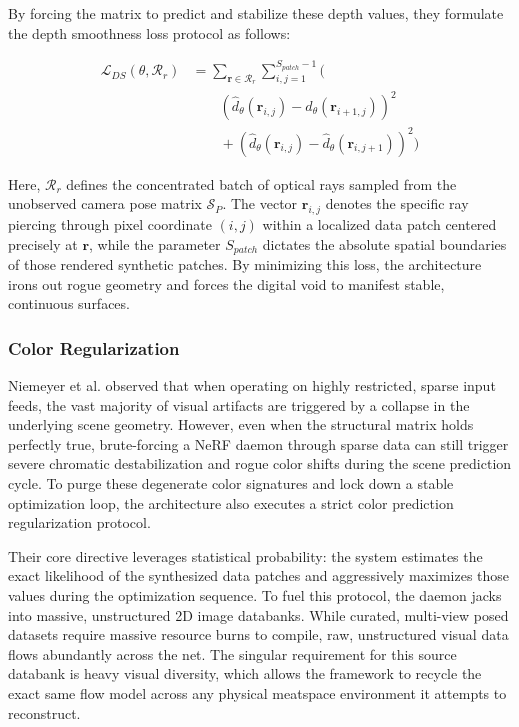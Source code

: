 By forcing the matrix to predict and stabilize these depth values, they formulate the depth smoothness loss protocol as follows:

\begin{equation}
\begin{split}
\mathcal{L}_{DS}(\theta, \mathcal{R}_r) &= \sum_{\mathbf{r} \in \mathcal{R}_r} \sum_{i,j=1}^{S_{patch}-1} \Bigg( \\
&\qquad \left(\hat{d}_\theta(\mathbf{r}_{i,j}) - \hat{d}_\theta(\mathbf{r}_{i+1,j})\right)^2 \\
&\qquad + \left(\hat{d}_\theta(\mathbf{r}_{i,j}) - \hat{d}_\theta(\mathbf{r}_{i,j+1})\right)^2 \Bigg)
\end{split}
\end{equation}

Here, $\mathcal{R}_r$ defines the concentrated batch of optical rays sampled from the unobserved camera pose matrix $\mathcal{S}_P$. The vector $\mathbf{r}_{i,j}$ denotes the specific ray piercing through pixel coordinate $(i,j)$ within a localized data patch centered precisely at $\mathbf{r}$, while the parameter $S_{patch}$ dictates the absolute spatial boundaries of those rendered synthetic patches. By minimizing this loss, the architecture irons out rogue geometry and forces the digital void to manifest stable, continuous surfaces. \cite{niemeyer2022regnerf}

\subsubsection{Color Regularization}
Niemeyer et al. observed that when operating on highly restricted, sparse input feeds, the vast majority of visual artifacts are triggered by a collapse in the underlying scene geometry. However, even when the structural matrix holds perfectly true, brute-forcing a NeRF daemon through sparse data can still trigger severe chromatic destabilization and rogue color shifts during the scene prediction cycle. To purge these degenerate color signatures and lock down a stable optimization loop, the architecture also executes a strict color prediction regularization protocol.

Their core directive leverages statistical probability: the system estimates the exact likelihood of the synthesized data patches and aggressively maximizes those values during the optimization sequence. To fuel this protocol, the daemon jacks into massive, unstructured 2D image databanks. While curated, multi-view posed datasets require massive resource burns to compile, raw, unstructured visual data flows abundantly across the net.  \cite{niemeyer2022regnerf} The singular requirement for this source databank is heavy visual diversity, which allows the framework to recycle the exact same flow model across any physical meatspace environment it attempts to reconstruct. 

